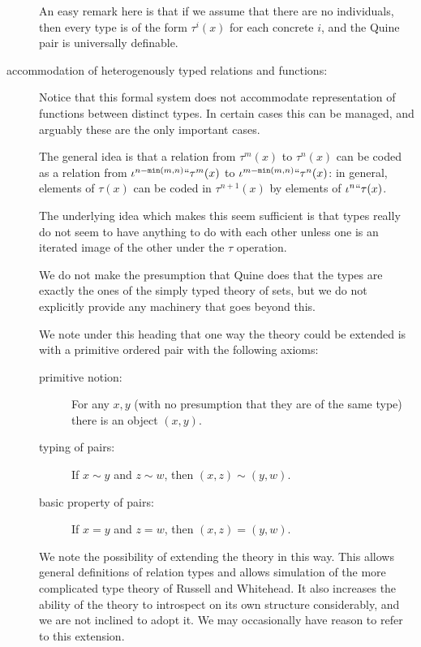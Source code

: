 \documentclass[12pt]{article}
\begin{document}
\begin{description}
An easy remark here is that if we assume that there are no individuals, then every type is of the form $\tau^i(x)$ for each concrete $i$, and the Quine pair is universally definable.

\item[accommodation of heterogenously typed relations and functions:]

Notice that this formal system does not accommodate representation of functions between distinct types.  In certain cases this can be managed, and arguably these are the only important cases.

The general idea is that a relation from $\tau^m(x)$ to $\tau^n(x)$ can be coded as a relation from $\iota^{n-{\tt min}(m,n)}``\tau^m(x)$ to $\iota^{m-{\tt min}(m,n)}``\tau^n(x)$:  in general, elements of $\tau(x)$ can be coded in $\tau^{n+1}(x)$ by elements of $\iota^n``\tau(x)$.

The underlying idea which makes this seem sufficient is that types really do not seem to have anything to do with each other unless one is an iterated image of the other under the $\tau$ operation.

We do not make the presumption that Quine does that the types are exactly the ones of the simply typed theory of sets, but we do not explicitly provide any machinery that goes beyond this.

We note under this heading that one way the theory could be extended is with a primitive ordered pair with the following axioms:

\begin{description}

\item[primitive notion:]  For any $x,y$ (with no presumption that they are of the same type) there is an object $(x,y)$.

\item[typing of pairs:]  If $x \sim y$ and $z \sim w$, then $(x,z) \sim (y,w)$.

\item[basic property of pairs:]  If $x=y$ and $z=w$, then $(x,z)=(y,w)$.

\end{description}

We note the possibility of extending the theory in this way.  This allows general definitions of relation types and allows simulation of the more complicated type theory of Russell and Whitehead.  It also increases the ability
of the theory to introspect on its own structure considerably, and we are not inclined to adopt it.  We may occasionally have reason to refer to this extension.

\end{description}
\end{document}
